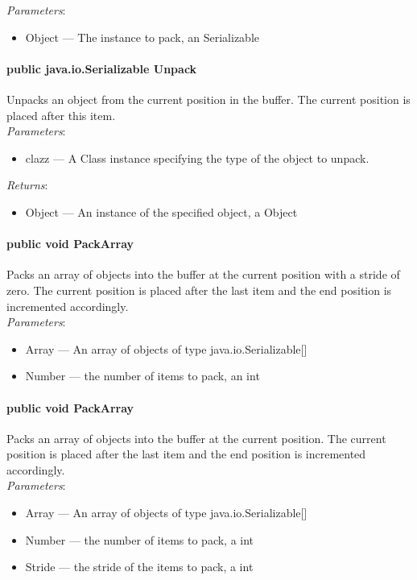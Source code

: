 \documentclass[$Date: 2003/06/26 19:29:31 $]{glabarticle}
\begin{document}
\textit{Parameters}:
\begin{itemize}
\item[] Object --- The instance to pack, an Serializable
\end{itemize}

\paragraph{public java.io.Serializable Unpack}

Unpacks an object from the current position in the buffer. The current
position is placed after this item. \\

\textit{Parameters}:
\begin{itemize}
\item[] clazz --- A Class instance specifying the type of the object to unpack.
\end{itemize}

\textit{Returns}:
\begin{itemize}
\item[] Object --- An instance of the specified object, a Object
\end{itemize}

\paragraph{public void PackArray}
Packs an array of objects into the buffer at the current position with a stride
of zero. The current position is placed after the last item and the end
position is incremented accordingly. \\
\textit{Parameters}:
\begin{itemize}
\item[] Array --- An array of objects of type java.io.Serializable[]
\item[] Number --- the number of items to pack, an int
\end{itemize}

\paragraph{public void PackArray}
Packs an array of objects into the buffer at the current position.
The current position is placed after the last item and the end
position is incremented accordingly. \\
\textit{Parameters}:
\begin{itemize}
\item[] Array --- An array of objects of  type java.io.Serializable[]
\item[] Number --- the number of items to pack, a int
\item[] Stride --- the stride of the items to pack, a int
\end{itemize}
\end{document}
